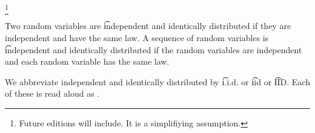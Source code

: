
\footnote{Future editions will include. It is a simplifiying assumption.}


Two random variables are \t{independent and identically distributed} if they are independent and have the same law.
A sequence of random variables is \t{independent and identically distributed} if the random variables are independent and each random variable has the same law.


We abbreviate independent and identically distributed by \t{i.i.d.} or \t{iid} or \t{IID}.
Each of these is read aloud as .

\blankpage
